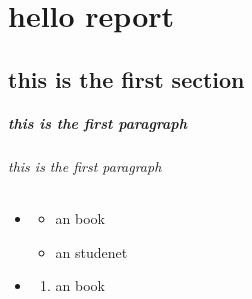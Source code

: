 \documentclass{report}
\begin{document}
\chapter{hello report}
\section{this is the first section}
\paragraph{this is the first paragraph}
\subparagraph{this is the first paragraph}

\begin{itemize}
    \item   
    \begin{itemize}
            \item an book
            \item an studenet
    \end{itemize}    
    \item  
    \begin{enumerate}
        \item an book
    \end{enumerate}
\end{itemize}   
\end{document}
